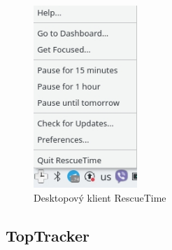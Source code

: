 \documentclass[thesis=B,czech]{FITthesis}[2012/06/26]
\begin{document}
\begin{figure}[h]\centering
	\includegraphics[width=0.35\textwidth]{rescuetime2.jpg}
	\caption[Desktopový klient RescueTime]{Desktopový klient RescueTime}\label{fig:rescuetime2}
\end{figure}

\subsection{TopTracker}
\end{document}
